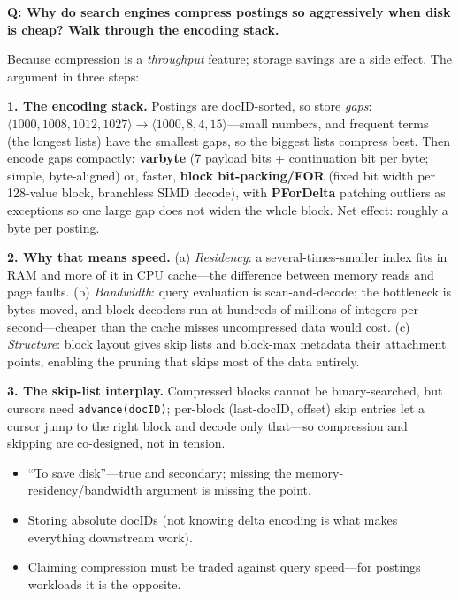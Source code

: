 \begin{interviewq}
\textbf{Q: Why do search engines compress postings so aggressively when disk is cheap? Walk through the encoding stack.}

 \quad {} \quad \badgefreq{\freqlow}

\stronganswer

Because compression is a \emph{throughput} feature; storage savings are a side effect. The argument in three steps:

\textbf{1. The encoding stack.} Postings are docID-sorted, so store \emph{gaps}: $\langle 1000, 1008, 1012, 1027\rangle \rightarrow \langle 1000, 8, 4, 15\rangle$---small numbers, and frequent terms (the longest lists) have the smallest gaps, so the biggest lists compress best. Then encode gaps compactly: \textbf{varbyte} (7 payload bits + continuation bit per byte; simple, byte-aligned) or, faster, \textbf{block bit-packing/FOR} (fixed bit width per 128-value block, branchless SIMD decode), with \textbf{PForDelta} patching outliers as exceptions so one large gap does not widen the whole block. Net effect: roughly a byte per posting.

\textbf{2. Why that means speed.} (a) \emph{Residency}: a several-times-smaller index fits in RAM and more of it in CPU cache---the difference between memory reads and page faults. (b) \emph{Bandwidth}: query evaluation is scan-and-decode; the bottleneck is bytes moved, and block decoders run at hundreds of millions of integers per second---cheaper than the cache misses uncompressed data would cost. (c) \emph{Structure}: block layout gives skip lists and block-max metadata their attachment points, enabling the pruning that skips most of the data entirely.

\textbf{3. The skip-list interplay.} Compressed blocks cannot be binary-searched, but cursors need \texttt{advance(docID)}; per-block (last-docID, offset) skip entries let a cursor jump to the right block and decode only that---so compression and skipping are co-designed, not in tension.

\redflags
\begin{itemize}
    \item ``To save disk''---true and secondary; missing the memory-residency/bandwidth argument is missing the point.
    \item Storing absolute docIDs (not knowing delta encoding is what makes everything downstream work).
    \item Claiming compression must be traded against query speed---for postings workloads it is the opposite.
\end{itemize}


\end{interviewq}
